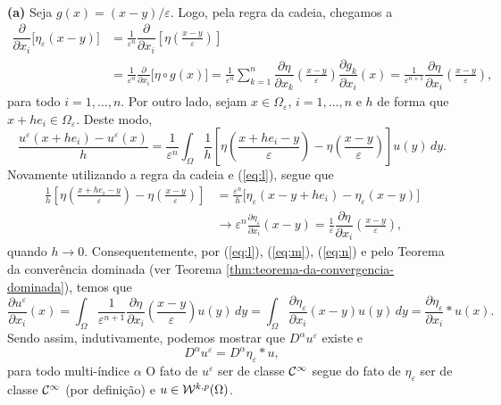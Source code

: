 \begin{prf}
    ~

    \textbf{(a)} Seja $g(x) = (x-y)/\varepsilon $. Logo, pela regra da cadeia, chegamos a
    \begin{align}
        \dfrac{\partial}{\partial x_i} \big[\eta_\varepsilon(x-y)\big] &= \frac{1}{\varepsilon^n}\dfrac{\partial }{\partial x_i}\left[\eta\left( \frac{x - y}{\varepsilon} \right) \right]\label{eq:l} \\
        &=\frac{1}{\varepsilon^n} \frac{\partial}{\partial x_i} \big[ \eta \circ g(x) \big] = \frac{1}{\varepsilon^n} \sum_{k =1}^n \dfrac{\partial \eta}{\partial x_k}\left( \frac{x - y}{\varepsilon} \right) \dfrac{\partial g_k}{\partial x_i}(x) = \frac{1}{\varepsilon^{n+1}} \dfrac{\partial \eta}{\partial x_i}\left( \frac{x - y}{\varepsilon} \right), \nonumber
    \end{align}
    para todo $i = 1,\dots,n$. Por outro lado, sejam $x \in \Omega_\varepsilon$, $i = 1,\dots,n$ e $h$ de forma que $x + he_i \in \Omega_\varepsilon$. Deste modo,
    \begin{equation} \label{eq:m}
        \frac{u^\varepsilon(x + he_i) - u^\varepsilon(x)}{h} 
            = \frac{1}{\varepsilon^n} \int_\Omega \frac{1}{h}\left[  \eta\left( \frac{x + he_i - y}{\varepsilon} \right) - \eta\left( \frac{x -y}{\varepsilon} \right) \right] u(y) \,dy.
    \end{equation} 
    Novamente utilizando a regra da cadeia e (\ref{eq:l}), segue que
    \begin{equation} \label{eq:n}
        \begin{aligned}
            \frac{1}{h}\left[  \eta\left( \frac{x + he_i - y}{\varepsilon} \right) - \eta\left( \frac{x -y}{\varepsilon} \right) \right] &=
            \frac{\varepsilon^n}{h} \bigg[ \eta_\varepsilon (x-y + he_i) - \eta_\varepsilon(x-y) \bigg]\\
            &\to
            \varepsilon^n \frac{\partial\eta_\varepsilon}{\partial x_i} (x-y) =
            \frac{1}{\varepsilon}\dfrac{\partial \eta}{\partial x_i}\left( \frac{x - y}{\varepsilon} \right),
        \end{aligned}
    \end{equation}
    quando $h \to 0$. Consequentemente, por (\ref{eq:l}), (\ref{eq:m}), (\ref{eq:n}) e pelo Teorema da converência dominada (ver Teorema \ref{thm:teorema-da-convergencia-dominada}), temos que
    \[
        \dfrac{\partial u^\varepsilon}{\partial x_i}(x) = \int_\Omega \frac{1}{\varepsilon^{n+1}} \dfrac{\partial \eta}{\partial x_i}\left( \frac{x - y}{\varepsilon} \right) u(y) \,dy = \int_\Omega \dfrac{\partial \eta_\varepsilon}{\partial x_i} (x-y) u(y) \,dy = \frac{\partial \eta_\varepsilon}{\partial x_i} * u(x).
    \]
    Sendo assim,
    indutivamente, podemos mostrar que $D^\alpha u^\varepsilon$ existe e
    \[
        D^\alpha u^\varepsilon = D^\alpha\eta_\varepsilon * u,
    \]
    para todo multi-índice $\alpha$
    O fato de $u^\varepsilon$ ser de classe $\mathcal{C}^\infty$ segue do fato de $\eta_\varepsilon$ ser de classe $\mathcal{C}^\infty$ (por definição) e $u \in \mathcal{W}^{k,p}(\Omega)$.


\end{prf}

